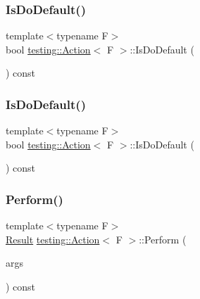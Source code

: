 \subsubsection{\texorpdfstring{IsDoDefault()}{IsDoDefault()}\hspace{0.1cm}{\footnotesize\ttfamily [2/3]}}
{\footnotesize\ttfamily template$<$typename F$>$ \\
bool \mbox{\hyperlink{classtesting_1_1_action}{testing\+::\+Action}}$<$ F $>$\+::Is\+Do\+Default (\begin{DoxyParamCaption}{ }\end{DoxyParamCaption}) const\hspace{0.3cm}{\ttfamily [inline]}}

\mbox{\label{classtesting_1_1_action_a4468ca2ea5e9f7363271145992d09dba}} 
\subsubsection{\texorpdfstring{IsDoDefault()}{IsDoDefault()}\hspace{0.1cm}{\footnotesize\ttfamily [3/3]}}
{\footnotesize\ttfamily template$<$typename F$>$ \\
bool \mbox{\hyperlink{classtesting_1_1_action}{testing\+::\+Action}}$<$ F $>$\+::Is\+Do\+Default (\begin{DoxyParamCaption}{ }\end{DoxyParamCaption}) const\hspace{0.3cm}{\ttfamily [inline]}}

\mbox{\label{classtesting_1_1_action_a5489a68def1d82eb61df819eae52dc8f}} 
\subsubsection{\texorpdfstring{Perform()}{Perform()}\hspace{0.1cm}{\footnotesize\ttfamily [1/3]}}
{\footnotesize\ttfamily template$<$typename F$>$ \\
\mbox{\hyperlink{classtesting_1_1_action_a9af08a21ad329331fde856cba9b6dea2}{Result}} \mbox{\hyperlink{classtesting_1_1_action}{testing\+::\+Action}}$<$ F $>$\+::Perform (\begin{DoxyParamCaption}\item[{\mbox{\hyperlink{classtesting_1_1_action_ae27fda510696a9294f991de5b1abfaf2}{Argument\+Tuple}}}]{args }\end{DoxyParamCaption}) const\hspace{0.3cm}{\ttfamily [inline]}}


